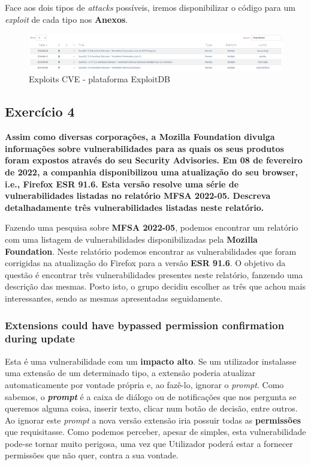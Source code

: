 \documentclass[11t]{article}
\begin{document}
Face aos dois tipos de \textit{attacks} possíveis, iremos disponibilizar o código para um \textit{exploit} de cada tipo nos \textbf{Anexos}.

\begin{figure}[H]
    \centering
    \includegraphics[width=1\textwidth]{images/exploitHeratbleedPergunta3.png}
    \caption{Exploits CVE - plataforma ExploitDB}
\end{figure}



\clearpage
\subsection{Exercício 4}
\textbf{Assim como diversas corporações, a Mozilla Foundation divulga informações sobre vulnerabilidades para as quais os seus produtos foram expostos através do seu Security Advisories. Em 08 de fevereiro de 2022, a companhia disponibilizou uma atualização do seu browser, i.e., Firefox ESR 91.6. Esta versão resolve uma série de vulnerabilidades listadas no relatório MFSA 2022-05. Descreva detalhadamente três vulnerabilidades listadas neste relatório.}

\vspace{0.5cm}

Fazendo uma pesquisa sobre \textbf{MFSA 2022-05}, podemos encontrar um relatório com uma listagem de vulnerabilidades disponibilizadas pela \textbf{Mozilla Foundation}. Neste relatório podemos encontrar as vulnerabilidades que foram corrigidas na atualização do Firefox para a versão \textbf{ESR 91.6}. O objetivo da questão é encontrar três vulnerabilidades presentes neste relatório, fanzendo uma descrição das mesmas. Posto isto, o grupo decidiu escolher as três que achou mais interessantes, sendo as mesmas apresentadas seguidamente. 

\vspace{0.5cm}

\subsubsection*{\textbf{Extensions could have bypassed permission confirmation during update}}

Esta é uma vulnerabilidade com um \textbf{impacto alto}. Se um utilizador instalasse uma extensão de um determinado tipo, a extensão poderia atualizar automaticamente por vontade própria e, ao fazê-lo, ignorar o \textit{prompt}. Como sabemos, o \textit{\textbf{prompt}} é a caixa de diálogo ou de notificações que nos pergunta se queremos alguma coisa, inserir texto, clicar num botão de decisão, entre outros. Ao ignorar este \textit{prompt} a nova versão extensão iria possuir todas as \textbf{permissões} que requisitasse. Como podemos perceber, apesar de simples, esta vulnerabilidade pode-se tornar muito perigosa, uma vez que Utilizador poderá estar a fornecer permissões que não quer, contra a sua vontade.
\end{document}
